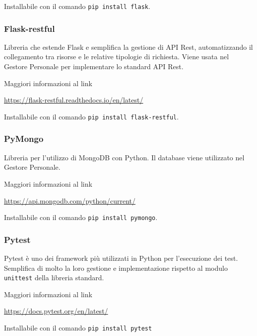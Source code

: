 Installabile con il comando \texttt{pip install flask}.

\subsubsection{Flask-restful}
Libreria che estende Flask e semplifica la gestione di API Rest, automatizzando il collegamento tra risorse e le relative tipologie di richiesta.
Viene usata nel Gestore Personale per implementare lo standard API Rest.

Maggiori informazioni al link

\begin{center}
    \url{https://flask-restful.readthedocs.io/en/latest/}
\end{center}

Installabile con il comando \texttt{pip install flask-restful}.

\subsubsection{PyMongo}

Libreria per l'utilizzo di MongoDB con Python. Il database viene utilizzato nel Gestore Personale.

Maggiori informazioni al link

\begin{center}
    \url{https://api.mongodb.com/python/current/}
\end{center}

Installabile con il comando \texttt{pip install pymongo}.

\subsubsection{Pytest}
Pytest è uno dei framework più utilizzati in Python per l'esecuzione dei test. Semplifica di molto la loro gestione e implementazione rispetto al modulo \texttt{unittest}
della libreria standard.

Maggiori informazioni al link

\begin{center}
    \url{https://docs.pytest.org/en/latest/}
\end{center}

Installabile con il comando \texttt{pip install pytest}
